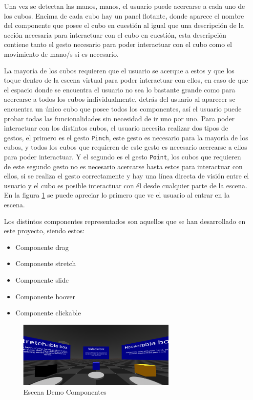 \documentclass[a4paper, 12pt]{book}
\begin{document}
Una vez se detectan las manos, manos, el usuario puede acercarse a cada uno de los cubos. Encima de cada cubo hay un panel flotante, donde aparece el nombre del componente que posee el cubo en cuestión al igual que una descripción de la acción necesaria para interactuar con el cubo en cuestión, esta descripción contiene tanto el gesto necesario para poder interactuar con el cubo como el movimiento de mano/s si es necesario. 

La mayoría de los cubos requieren que el usuario se acerque a estos y que los toque dentro de la escena virtual para poder interactuar con ellos, en caso de que el espacio donde se encuentra el usuario no sea lo bastante grande como para acercarse a todos los cubos individualmente, detrás del usuario al aparecer se encuentra un único cubo que posee todos los componentes, así el usuario puede probar todas las funcionalidades sin necesidad de ir uno por uno. 
Para poder interactuar con los distintos cubos, el usuario necesita realizar dos tipos de gestos, el primero es el gesto \texttt{Pinch}, este gesto es necesario para la mayoría de los cubos, y todos los cubos que requieren de este gesto es necesario acercarse a ellos para poder interactuar. Y el segundo es el gesto \texttt{Point}, los cubos que requieren de este segundo gesto no es necesario acercarse hasta estos para interactuar con ellos, si se realiza el gesto correctamente y hay una línea directa de visión entre el usuario y el cubo es posible interactuar con él desde cualquier parte de la escena. 
En la figura \ref{fig:demo_componentes} se puede apreciar lo primero que ve el usuario al entrar en la escena.

Los distintos componentes representados son aquellos que se han desarrollado en este proyecto, siendo estos: 
\begin{itemize}
  \item Componente drag
  \item Componente stretch
  \item Componente slide
  \item Componente hoover
  \item Componente clickable
\end{itemize}

\begin{figure}[H] 
  \centering
  \includegraphics[width=0.7\textwidth]{img/demo_componentes.png} 
  \caption{Escena Demo Componentes}
  \label{fig:demo_componentes}
\end{figure}
\end{document}
